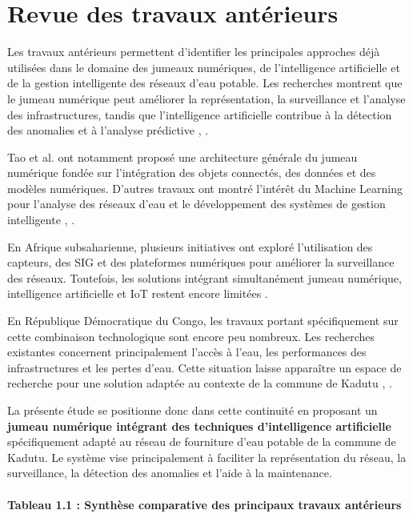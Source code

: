 \section{Revue des travaux antérieurs}
\label{revue-des-travaux-anterieurs}

Les travaux antérieurs permettent d'identifier les principales
approches déjà utilisées dans le domaine des jumeaux numériques, de
l'intelligence artificielle et de la gestion intelligente des réseaux
d'eau potable. Les recherches montrent que le jumeau numérique peut
améliorer la représentation, la surveillance et l'analyse des
infrastructures, tandis que l'intelligence artificielle contribue à la
détection des anomalies et à l'analyse prédictive \cite{ref8},
\cite{ref17}.

Tao et al. ont notamment proposé une architecture générale du jumeau
numérique fondée sur l'intégration des objets connectés, des données et
des modèles numériques. D'autres travaux ont montré l'intérêt du
Machine Learning pour l'analyse des réseaux d'eau et le développement
des systèmes de gestion intelligente \cite{ref17}, \cite{ref76}.

En Afrique subsaharienne, plusieurs initiatives ont exploré l'utilisation
des capteurs, des SIG et des plateformes numériques pour améliorer la
surveillance des réseaux. Toutefois, les solutions intégrant
simultanément jumeau numérique, intelligence artificielle et IoT restent
encore limitées \cite{ref77}.

En République Démocratique du Congo, les travaux portant spécifiquement
sur cette combinaison technologique sont encore peu nombreux. Les
recherches existantes concernent principalement l'accès à l'eau, les
performances des infrastructures et les pertes d'eau. Cette situation
laisse apparaître un espace de recherche pour une solution adaptée au
contexte de la commune de Kadutu \cite{ref78}, \cite{ref79}.

La présente étude se positionne donc dans cette continuité en proposant
un \textbf{jumeau numérique intégrant des techniques d'intelligence
	artificielle} spécifiquement adapté au réseau de fourniture d'eau
potable de la commune de Kadutu. Le système vise principalement à
faciliter la représentation du réseau, la surveillance, la détection des
anomalies et l'aide à la maintenance.

\paragraph{Tableau 1.1 : Synthèse comparative des principaux travaux antérieurs}

